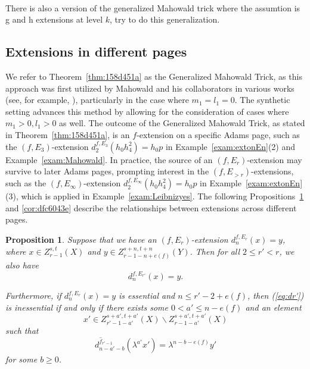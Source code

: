 \documentclass[12pt,a4paper]{article}
\newtheorem{proposition}[equation]{Proposition}
\begin{document}
\begin{sloppy}
\paragraph{}
There is also a version of the generalized Mahowald trick where the assumtion is g and h extensions at level $k$, try to do this generalization.

\subsection{Extensions in different pages}
    We refer to Theorem~\ref{thm:158d451a} as the Generalized Mahowald Trick, as this approach was first utilized by Mahowald and his collaborators in various works (see, for example, \cite{MahowaldTangora}), particularly in the case where $m_1 = l_1 = 0$. The synthetic setting advances this method by allowing for the consideration of cases where $m_1>0, l_1>0$ as well.
The outcome of the Generalized Mahowald Trick, as stated in Theorem~\ref{thm:158d451a}, is an $f$-extension on a specific Adams page, such as the $(f, E_3)$-extension $d_2^{f, E_3} (h_0h_4^2) = h_0 p$ in Example~\ref{exam:extonEn}(2) and Example~\ref{exam:Mahowald}. In practice, the source of an $(f, E_r)$-extension may survive to later Adams pages, prompting interest in the $(f, E_{>r})$-extensions, such as the $(f, E_\infty)$-extension $d_2^{f, E_\infty} (h_0h_4^2) = h_0 p$ in Example~\ref{exam:extonEn}(3), which is applied in Example~\ref{exam:Leibnizyes}. The following Propositions~\ref{prop:dec738d3} and \ref{cor:dfc6043e} describe the relationships between extensions across different pages.

\begin{proposition}\label{prop:dec738d3}
    Suppose that we have an $(f,E_r)$-extension $d^{f,E_r}_n(x)=y$, where $x\in Z_{r-1}^{s,t}(X)$ and $y\in Z_{r-1-n+e(f)}^{s+n,t+n}(Y)$. Then for all $2\le r'<r$, we also have
    \begin{equation}\label{eq:dr'}
        d^{f,E_{r'}}_n(x)=y.
    \end{equation}

    Furthermore, if $d^{f,E_r}_n(x)=y$ is essential and $n\le r'-2+e(f)$, then (\ref{eq:dr'}) is inessential if and only if there exists some $0<a'\le n-e(f)$ and an element
    $$x'\in Z_{r'-1-a'}^{s+a',t+a'}(X)\backslash Z_{r-1-a'}^{s+a',t+a'}(X)$$
    such that
    $$d^{\hat f_{r'-1}}_{n-a'-b}(\lambda^{a'} x')=\lambda^{n-b-e(f)} y'$$
    for some $b\ge 0$.

\end{proposition}


\end{sloppy}
\end{document}
